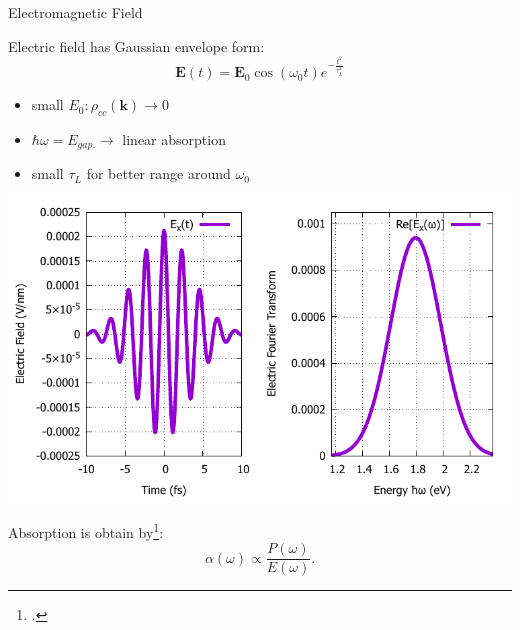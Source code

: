 \documentclass{beamer}
\begin{document}
	\begin{frame}{Electromagnetic Field}
	\begin{multicols}{2}
Electric field has Gaussian envelope form:
\begin{equation}
	\textbf{E}(t) = \textbf{E}_0 \cos(\omega_0 t)e^{-\frac{t^2}{\tau_L^2}}
\end{equation}
\begin{itemize}
	\item small $E_0: \rho_{cc}(\textbf{k}) \to 0$
	\item $\hbar \omega = E_{gap.} \to $ linear absorption
	\item small $\tau_L$ for better range around $\omega_0$
\end{itemize}
\columnbreak
\includegraphics[width=1\linewidth]{images/Eat.pdf}

Absorption is obtain by\footcite{haug_quantum_2009}:
\begin{equation}
	\alpha(\omega) \propto \frac{P(\omega)}{E(\omega)}.
\end{equation}
	\end{multicols}
	\end{frame}
\end{document}
